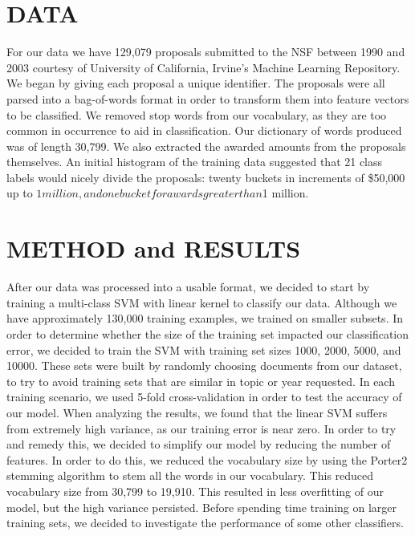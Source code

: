 \documentclass{article}
\begin{document}
\section{DATA}
For our data we have 129,079 proposals submitted to the NSF between 1990 and 2003 courtesy of University of California, Irvine’s Machine Learning Repository. We began by giving each proposal a unique identifier. The proposals were all parsed into a bag-of-words format in order to transform them into feature vectors to be classified.  We removed stop words from our vocabulary, as they are too common in occurrence to aid in classification.  Our dictionary of words produced was of length 30,799.  We also extracted the awarded amounts from the proposals themselves.  An initial histogram of the training data suggested that 21 class labels would nicely divide the proposals: twenty buckets in increments of \$50,000 up to $1 million, and one bucket for awards greater than $1 million. \\

\section{METHOD and RESULTS}
After our data was processed into a usable format, we decided to start by training a multi-class SVM with linear kernel to classify our data.  Although we have approximately 130,000 training examples, we trained on smaller subsets.  In order to determine whether the size of the training set impacted our classification error, we decided to train the SVM with training set sizes 1000, 2000, 5000, and 10000.  These sets were built by randomly choosing documents from our dataset, to try to avoid training sets that are similar in topic or year requested.  In each training scenario, we used 5-fold cross-validation in order to test the accuracy of our model.  When analyzing the results, we found that the linear SVM suffers from extremely high variance, as our training error is near zero.  In order to try and remedy this, we decided to simplify our model by reducing the number of features.  In order to do this, we reduced the vocabulary size by using the Porter2 stemming algorithm to stem all the words in our vocabulary.  This reduced vocabulary size from 30,799 to 19,910.  This resulted in less overfitting of our model, but the high variance persisted.  Before spending time training on larger training sets, we decided to investigate the performance of some other classifiers.\\
\end{document}
